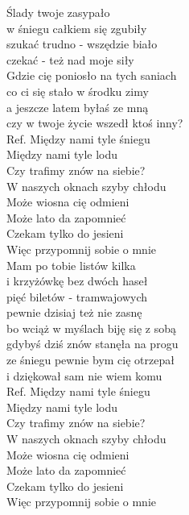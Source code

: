 Ślady twoje zasypało \tab{}\\
w śniegu całkiem się zgubiły \tab{}\\
szukać trudno - wszędzie biało \tab{}\\
czekać - też nad moje siły\tab{} \\
Gdzie cię poniosło na tych saniach \\
co ci się stało w środku zimy \tab{}\\
a jeszcze latem byłaś ze mną \tab{}\\
czy w twoje życie wszedł ktoś inny? \\
\hops
Ref. Między nami tyle śniegu \tab{} \\
 Między nami tyle lodu \tab{}\\
 Czy trafimy znów na siebie? \\
 W naszych oknach szyby chłodu\\
 Może wiosna cię odmieni \tab{}\\
 Może lato da zapomnieć \tab{}\\
 Czekam tylko do jesieni \tab{}\\
 Więc przypomnij sobie o mnie  \\
\hops
Mam po tobie listów kilka \\
i krzyżówkę bez dwóch haseł \\
pięć biletów - tramwajowych \\
pewnie dzisiaj też nie zasnę \\
bo wciąż w myślach biję się z sobą \\
gdybyś dziś znów stanęła na progu \\
ze śniegu pewnie bym cię otrzepał \\
i dziękował sam nie wiem komu \\
\hops
Ref. Między nami tyle śniegu \\
 Między nami tyle lodu \\
 Czy trafimy znów na siebie? \\
 W naszych oknach szyby chłodu \\
 Może wiosna cię odmieni \\
 Może lato da zapomnieć \\
 Czekam tylko do jesieni \\
 Więc przypomnij sobie o mnie \\